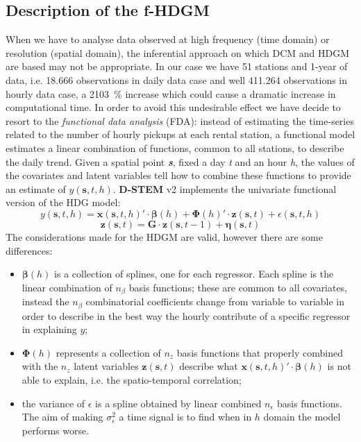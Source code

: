 \subsection{Description of the f-HDGM}

When we have to analyse data observed at high frequency (time domain) or resolution (spatial domain), the inferential approach on which DCM and HDGM are based may not be appropriate. In our case we have \num{51} stations and \num{1}-year of data, i.e. \num{18,666} observations in daily data case and well \num{411,264} observations in hourly data case, a \SI{2103}{\percent} increase which could cause a dramatic increase in computational time. In order to avoid this undesirable effect we have decide to resort to the \textit{functional data analysis} (FDA): instead of estimating the time-series related to the number of hourly pickups at each rental station, a functional model estimates a linear combination of functions, common to all stations, to describe the daily trend. Given a spatial point \textit{\textbf{s}}, fixed a day \textit{t} and an hour \textit{h}, the values of the covariates and latent variables tell how to combine these functions to provide an estimate of $y(\boldsymbol{s}, t, h)$. \textbf{D-STEM} v\num{2} implements the univariate functional version of the HDG model:
\begin{displaymath}
	y(\boldsymbol{s}, t, h) = \boldsymbol{x}(\boldsymbol{s}, t, h)' \cdot \boldsymbol{\beta}(h) + \boldsymbol{\Phi}(h)' \cdot \boldsymbol{z}(\boldsymbol{s}, t) + \epsilon(\boldsymbol{s}, t, h)
\end{displaymath} 
\begin{displaymath}
	\boldsymbol{z}(\boldsymbol{s}, t) = \boldsymbol{G} \cdot \boldsymbol{z}(\boldsymbol{s}, t-1) + \boldsymbol{\eta}(\boldsymbol{s}, t)
\end{displaymath}
The considerations made for the HDGM are valid, however there are some differences:
\begin{itemize}
	\item $\boldsymbol{\beta}(h)$ is a collection of splines, one for each regressor. Each spline is the linear combination of $n_\beta$ basis functions; these are common to all covariates, instead the $n_\beta$ combinatorial coefficients change from variable to variable in order to describe in the best way the hourly contribute of a specific regressor in explaining $y$;
	\item $\boldsymbol{\Phi}(h)$ represents a collection of $n_z$ basis functions that properly combined with the $n_z$ latent variables 	$\boldsymbol{z}(\boldsymbol{s}, t)$ describe what $\boldsymbol{x}(\boldsymbol{s}, t, h)' \cdot \boldsymbol{\beta}(h)$ is not able to explain, i.e. the spatio-temporal correlation;
	\item the variance of $\epsilon$ is a spline obtained by linear combined $n_\epsilon$ basis functions. The aim of making $\sigma_\epsilon^2$ a time signal is to find when in $h$ domain the model performs worse.
\end{itemize}
